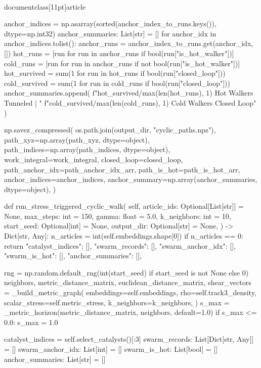\\documentclass[11pt]{article}
\begin{document}
\begin{CodeBlock}
        anchor_indices = np.asarray(sorted(anchor_index_to_runs.keys()), dtype=np.int32)
        anchor_summaries: List[str] = []
        for anchor_idx in anchor_indices.tolist():
            anchor_runs = anchor_index_to_runs.get(anchor_idx, [])
            hot_runs = [run for run in anchor_runs if bool(run["is_hot_walker"])]
            cold_runs = [run for run in anchor_runs if not bool(run["is_hot_walker"])]
            hot_survived = sum(1 for run in hot_runs if bool(run["closed_loop"]))
            cold_survived = sum(1 for run in cold_runs if bool(run["closed_loop"]))
            anchor_summaries.append(
                f"{hot_survived}/{max(len(hot_runs), 1)} Hot Walkers Tunneled | "
                f"{cold_survived}/{max(len(cold_runs), 1)} Cold Walkers Closed Loop"
            )

        np.savez_compressed(
            os.path.join(output_dir, "cyclic_paths.npz"),
            path_xyz=np.array(path_xyz, dtype=object),
            path_indices=np.array(path_indices, dtype=object),
            work_integral=work_integral,
            closed_loop=closed_loop,
            path_anchor_idx=path_anchor_idx_arr,
            path_is_hot=path_is_hot_arr,
            anchor_indices=anchor_indices,
            anchor_summary=np.array(anchor_summaries, dtype=object),
        )

    def run_stress_triggered_cyclic_walk(
        self,
        article_ids: Optional[List[str]] = None,
        max_steps: int = 150,
        gamma: float = 5.0,
        k_neighbors: int = 10,
        start_seed: Optional[int] = None,
        output_dir: Optional[str] = None,
    ) -> Dict[str, Any]:
        n_articles = int(self.embeddings.shape[0])
        if n_articles == 0:
            return {
                "catalyst_indices": [],
                "swarm_records": [],
                "swarm_anchor_idx": [],
                "swarm_is_hot": [],
                "anchor_summaries": [],
            }

        rng = np.random.default_rng(int(start_seed) if start_seed is not None else 0)
        neighbors, metric_distance_matrix, euclidean_distance_matrix, shear_vectors = _build_metric_graph(
            embeddings=self.embeddings,
            rho=self.track3_density,
            scalar_stress=self.metric_stress,
            k_neighbors=k_neighbors,
        )
        s_max = _metric_horizon(metric_distance_matrix, neighbors, default=1.0)
        if s_max <= 0.0:
            s_max = 1.0

        catalyst_indices = self.select_catalysts()[:3]
        swarm_records: List[Dict[str, Any]] = []
        swarm_anchor_idx: List[int] = []
        swarm_is_hot: List[bool] = []
        anchor_summaries: List[str] = []


\end{CodeBlock}
\end{document}
